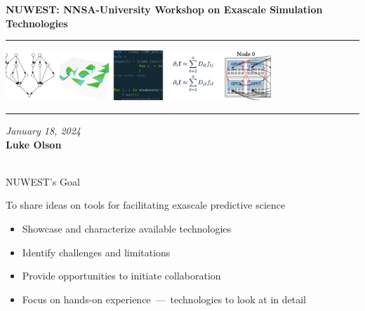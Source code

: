 \documentclass[aspectratio=169]{beamer}
\begin{document}
\begin{frame}\frametitle{}

\vspace*{0.2in}

\hspace*{0.0in}\textrm{{\huge\bfseries\color{IllinoisOrange} NUWEST: NNSA-University Workshop on Exascale Simulation Technologies}}

\vspace*{0.2in}
\hrule
\begin{center}
\includegraphics[width=0.75\textwidth]{./media/coverart-cs.pdf}
\end{center}
\hrule

\vspace*{0.1in}
\noindent\textit{January 18, 2024}\\
\vspace*{0.1in}
\noindent\textbf{\color{IllinoisOrange}Luke Olson}\\
\\

\end{frame}

\begin{frame}{NUWEST's Goal}
\begin{center}
\begin{tcolorbox}[colframe=IllinoisOrange]
To share ideas on tools for facilitating exascale predictive science
\end{tcolorbox}
\end{center}
\begin{itemize}
\item Showcase and characterize available technologies
\item Identify challenges and limitations
\item Provide opportunities to initiate collaboration
\item Focus on \alert{hands-on experience}~---~technologies to look at in detail
\end{itemize}
\end{frame}
\end{document}
